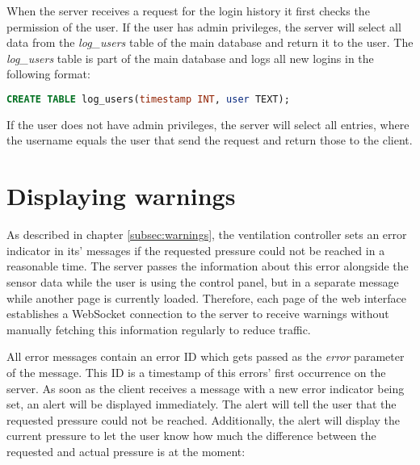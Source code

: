 When the server receives a request for the login history it first checks the permission of the user. If the user has admin privileges, the server will select all data from the \textit{log\_users} table of the main database and return it to the user.  The \textit{log\_users} table is part of the main database and logs all new logins in the following format:

\begin{lstlisting}[label = lst:log_users, language = SQL, numbers = none]
 CREATE TABLE log_users(timestamp INT, user TEXT);
\end{lstlisting}

If the user does not have admin privileges, the server will select all entries, where the username equals the user that send the request and return those to the client.





\section{Displaying warnings}
\label{sec:displaying_warnings}

As described in chapter \ref{subsec:warnings}, the ventilation controller sets an error indicator in its' messages if the requested pressure could not be reached in a reasonable time. The server passes the information about this error alongside the sensor data while the user is using the control panel, but in a separate message while another page is currently loaded. Therefore, each page of the web interface establishes a WebSocket connection to the server to receive warnings without manually fetching this information regularly to reduce traffic.

All error messages contain an error ID which gets passed as the \textit{error} parameter of the message. This ID is a timestamp of this errors' first occurrence on the server. As soon as the client receives a message with a new error indicator being set, an alert will be displayed immediately.  The alert will tell the user that the requested pressure could not be reached. Additionally, the alert will display the current pressure to let the user know how much the difference between the requested and actual pressure is at the moment:

